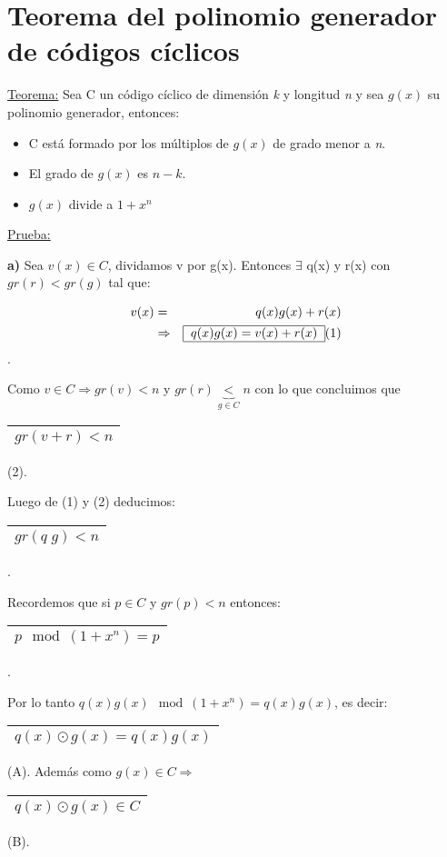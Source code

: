 \documentclass[12pt,a4paper]{report}
\begin{document}
	\section{Teorema del polinomio generador de códigos cíclicos}
	
		\underline{Teorema:} Sea C un código cíclico de dimensión \textit{k} y longitud \textit{n} y sea $g(x)$ su polinomio generador, entonces:
		
		\begin{itemize}
			\item C está formado por los múltiplos de $g(x)$ de grado menor a \textit{n}.
			\item El grado de $g(x)$ es $n-k$.
			\item $g(x)$ divide a $1+x^{n}$
		\end{itemize}
	
		\underline{Prueba:}
		
		\textbf{a)} Sea $v(x) \in C$, dividamos v por g(x). Entonces $\exists$ q(x) y r(x) con $gr(r) < gr(g)$ tal que: 
		
		\begin{eqnarray}
			\nonumber v(x) &=& q(x) g(x) + r(x) \\
			\nonumber & \Rightarrow & \begin{tabular}{|c|} \hline $q(x) g(x) = v(x) + r(x) $ \\ \hline \end{tabular} (1)
		\end{eqnarray}.
		
		Como $v \in C \Rightarrow gr(v) < n$ y $gr(r) \underbrace{<}_{g \in C} n $ con lo que concluimos que  \begin{tabular}{|c|} \hline $gr(v + r) < n $ \\ \hline \end{tabular} (2).
		
		Luego de (1) y (2) deducimos: \begin{tabular}{|c|} \hline $gr(q \; g) < n $ \\ \hline \end{tabular}.
		
		\vspace{3mm}
		Recordemos que si $p \in C$ y $gr(p) < n$ entonces: \begin{tabular}{|c|} \hline $p \mod (1+ x^{n}) = p$ \\ \hline \end{tabular}.
		
		\vspace{3mm}
		Por lo tanto $q(x) g(x) \mod (1 + x^{n}) = q(x) g(x)$, es decir: \begin{tabular}{|c|} \hline $ q(x) \odot g(x) = q(x) g(x) $ \\ \hline \end{tabular} (A). Además como $g(x) \in C \Rightarrow$ \begin{tabular}{|c|} \hline $q(x) \odot g(x) \in C $ \\ \hline \end{tabular} (B).
		
\end{document}
